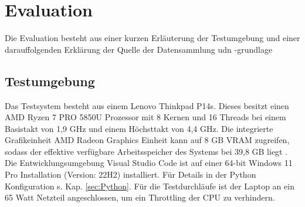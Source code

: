 \chapter{Evaluation}
\label{ch:Evaluation}
Die Evaluation besteht aus einer kurzen Erläuterung der Testumgebung und einer darauffolgenden Erklärung der Quelle der Datensammlung udn -grundlage
\section{Testumgebung}{ \label{sec:testumgebung}
Das Testsystem besteht aus einem Lenovo Thinkpad P14s. Dieses besitzt einen AMD Ryzen 7 PRO 5850U Prozessor mit 8 Kernen und 16 Threads bei einem Basistakt von 1,9 GHz und einem Höchsttakt von 4,4 GHz. Die integrierte Grafikeinheit AMD Radeon Graphics Einheit kann auf 8 GB VRAM zugreifen, sodass der effektive verfügbare Arbeitsspeicher des Systems bei 39,8 GB liegt \citep{PSREF21}. Die Entwicklungsumgebung \glqq Visual Studio Code\grqq{} ist auf einer 64-bit Windows 11 Pro Installation (Version: 22H2) installiert. Für Details in der Python Konfiguration s. Kap. \ref{sec:Python}. Für die Testdurchläufe ist der Laptop an ein 65 Watt Netzteil angeschlossen, um ein Throttling der CPU zu verhindern. \\ }


